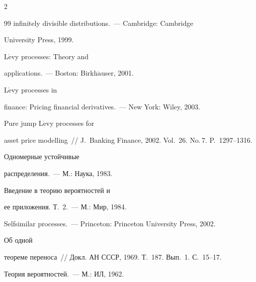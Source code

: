\begin{multicols}{2}
{{\begin{thebibliography}{99}
infinitely divisible distributions.~--- Cambridge: Cambridge

University Press, 1999.





L$\acute{\mbox{e}}$vy processes: Theory and

applications.~--- Boston: Birkh$\ddot{\mbox{a}}$user, 2001.



  L$\acute{\mbox{e}}$vy processes in

finance: Pricing financial derivatives.~--- New York: Wiley, 2003.



  Pure jump L$\acute{\mbox{e}}$vy processes for

asset price modelling~// J.~Banking Finance, 2002. Vol.~26. No.\,7. P.~1297--1316.



  Одномерные устойчивые

распределения.~--- М.: Наука, 1983.



  Введение в теорию вероятностей и

ее приложения. Т.~2.~--- М.: Мир, 1984.



 

Selfsimilar processes.~--- Princeton: Princeton University Press, 2002.




 Об одной

теореме переноса~// Докл. АН СССР, 1969. Т.~187. Вып.~1. С.~15--17.





\label{end\stat}




 Теория вероятностей.~--- М.: ИЛ, 1962.

\end{thebibliography}

}

}



\end{multicols}

